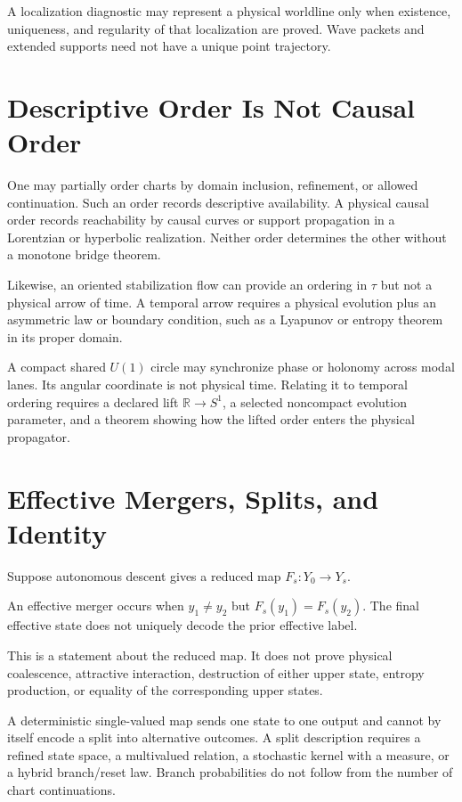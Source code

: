 \documentclass[11pt]{article}
\begin{document}
A localization diagnostic may represent a physical worldline only when
existence, uniqueness, and regularity of that localization are proved. Wave
packets and extended supports need not have a unique point trajectory.

\section{Descriptive Order Is Not Causal Order}

One may partially order charts by domain inclusion, refinement, or allowed
continuation. Such an order records descriptive availability. A physical
causal order records reachability by causal curves or support propagation in a
Lorentzian or hyperbolic realization. Neither order determines the other
without a monotone bridge theorem.

Likewise, an oriented stabilization flow can provide an ordering in $\tau$ but
not a physical arrow of time. A temporal arrow requires a physical evolution
plus an asymmetric law or boundary condition, such as a Lyapunov or entropy
theorem in its proper domain.

A compact shared $U(1)$ circle may synchronize phase or holonomy across modal
lanes. Its angular coordinate is not physical time. Relating it to temporal
ordering requires a declared lift $\mathbb R\to S^1$, a selected noncompact
evolution parameter, and a theorem showing how the lifted order enters the
physical propagator.

\section{Effective Mergers, Splits, and Identity}

Suppose autonomous descent gives a reduced map $F_s:Y_0\to Y_s$.

\begin{definition}
An effective merger occurs when $y_1\ne y_2$ but
$F_s(y_1)=F_s(y_2)$. The final effective state does not uniquely decode the
prior effective label.
\end{definition}

This is a statement about the reduced map. It does not prove physical
coalescence, attractive interaction, destruction of either upper state,
entropy production, or equality of the corresponding upper states.

A deterministic single-valued map sends one state to one output and cannot by
itself encode a split into alternative outcomes. A split description requires
a refined state space, a multivalued relation, a stochastic kernel with a
measure, or a hybrid branch/reset law. Branch probabilities do not follow from
the number of chart continuations.
\end{document}
